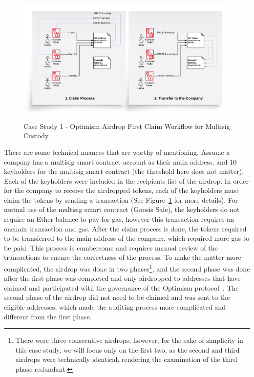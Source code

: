 \begin{figure}[t]
    \centering
{\includegraphics[width=1\textwidth]{figures/BlockchainAudit-OPAirdrop.png}}
{\caption[Case Study 1 - Optimism Airdrop First Claim Workflow]{Case Study 1 - Optimism Airdrop First Claim Workflow for Multisig Custody}\label{fig:opairdrop}}
\end{figure}
%

There are some technical nuances that are worthy of mentioning. Assume a company has a multisig smart contract account as their main address, and 10 keyholders for the multisig smart contract (the threshold here does not matter). Each of the keyholders were included in the recipients list of the airdrop. In order for the company to receive the airdropped tokens, each of the keyholders must claim the tokens by sending a transaction (See Figure~\ref{fig:opairdrop} for more details). For normal use of the multisig smart contract (\eg Gnosis Safe), the keyholders do not require an Ether balance to pay for gas, however this transaction requires an onchain transaction and gas. After the claim process is done, the tokens required to be transferred to the main address of the company, which required more gas to be paid. This process is cumbersome and requires manual review of the transactions to ensure the correctness of the process. To make the matter more complicated, the airdrop was done in two phases\footnote{There were three consecutive airdrops, however, for the sake of simplicity in this case study, we will focus only on the first two, as the second and third airdrops were technically identical, rendering the examination of the third phase redundant.}, and the second phase was done after the first phase was completed and only airdropped to addresses that have claimed and participated with the governance of the Optimism protocol~\cite{allen2023airdrop}. The second phase of the airdrop did not need to be claimed and was sent to the eligible addresses, which made the auditing process more complicated and different from the first phase. 


